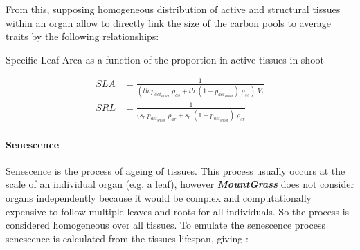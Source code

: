 \documentclass[a4paper,twoside, justified,marginals=raggedright, nobib]{tufte-handout}
\newcommand{\model}{\textit{\textbf{MountGrass }}}
\begin{document}
\indent From this, supposing homogeneous distribution of active and structural tissues within an organ allow to directly link the size of the carbon pools to average traits by the following relationships:
\begin{marginfigure}
\label{fig:SLA}
\caption{Specific Leaf Area as a function of the proportion in active tissues in shoot}
\end{marginfigure}

\begin{align}
  SLA &= \frac{1}{(th .  p_{act_{shoot}} . \rho_{as} + th . (1 -  p_{act_{shoot}}) . \rho_{ss} ) . V_{t}}\\
  SRL &= \frac{1}{(s_{r} .  p_{act_{shoot}} . \rho_{ar} + s_{r}.(1 -  p_{act_{shoot}}) . \rho_{sr}}
\end{align}


\paragraph{Senescence}

Senescence is the process of ageing of tissues. This process usually occurs at the scale of an individual organ (e.g. a leaf), however \model does not consider organs independently because it would be complex and computationally expensive to follow multiple leaves and roots for all individuals. So the process is considered homogeneous over all tissues. To emulate the senescence process senescence is calculated from the tissues lifespan, giving :
\end{document}
